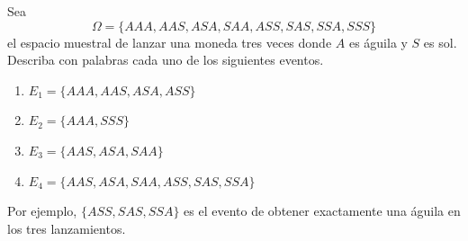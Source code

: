 \documentclass[12pt,a4paper]{article}
\begin{document}
    \begin{mdframed}[style=mdbluebox,frametitle={Ejercicio 5}]
        Sea
        \begin{equation*}
            \Omega = \{AAA, AAS, ASA, SAA, ASS, SAS, SSA, SSS\}
        \end{equation*}
        el espacio muestral de lanzar una moneda tres veces donde $A$ es águila y $S$ es sol. Describa con palabras cada uno de los siguientes eventos.
        \begin{enumerate}[label=(\alph*)]
            \item $E_1 = \{AAA, AAS, ASA, ASS\}$
            \item $E_2 = \{AAA, SSS\}$
            \item $E_3 = \{AAS, ASA, SAA\}$
            \item $E_4 = \{AAS, ASA, SAA, ASS, SAS, SSA\}$
        \end{enumerate}
        Por ejemplo, $\{ASS, SAS, SSA\}$ es el evento de obtener exactamente una águila en los tres lanzamientos.
    \end{mdframed}
\end{document}
